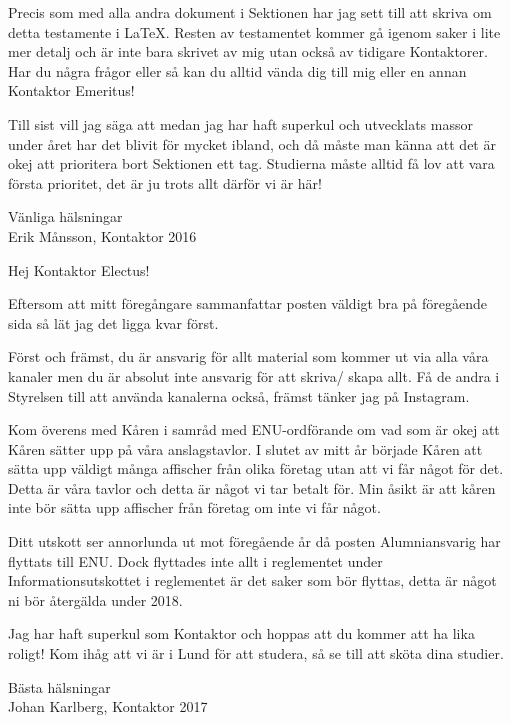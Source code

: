\documentclass[10pt]{article}
\begin{document}
Precis som med alla andra dokument i Sektionen har jag sett till att skriva om detta testamente i \LaTeX. Resten av testamentet kommer gå igenom saker i lite mer detalj och är inte bara skrivet av mig utan också av tidigare Kontaktorer. Har du några frågor eller så kan du alltid vända dig till mig eller en annan Kontaktor Emeritus!

Till sist vill jag säga att medan jag har haft superkul och utvecklats massor under året har det blivit för mycket ibland, och då måste man känna att det är okej att prioritera bort Sektionen ett tag. Studierna måste alltid få lov att vara första prioritet, det är ju trots allt därför vi är här!

\begin{itshape}
Vänliga hälsningar\\
Erik Månsson, Kontaktor 2016\\
\end{itshape}
\newpage
Hej Kontaktor Electus!

Eftersom att mitt föregångare sammanfattar posten väldigt bra på föregående sida så lät jag det ligga kvar först.

Först och främst, du är ansvarig för allt material som kommer ut via alla våra kanaler men du är absolut inte ansvarig för att skriva/ skapa allt. Få de andra i Styrelsen till att använda kanalerna också, främst tänker jag på Instagram.

Kom överens med Kåren i samråd med ENU-ordförande om vad som är okej att Kåren sätter upp på våra anslagstavlor. I slutet av mitt år började Kåren att sätta upp väldigt många affischer från olika företag utan att vi får något för det. Detta är våra tavlor och detta är något vi tar betalt för. Min åsikt är att kåren inte bör sätta upp affischer från företag om inte vi får något.

Ditt utskott ser annorlunda ut mot föregående år då posten Alumniansvarig har flyttats till ENU. Dock flyttades inte allt i reglementet under Informationsutskottet i reglementet är det saker som bör flyttas, detta är något ni bör återgälda under 2018.

Jag har haft superkul som Kontaktor och hoppas att du kommer att ha lika roligt! Kom ihåg att vi är i Lund för att studera, så se till att sköta dina studier.

\begin{itshape}
Bästa hälsningar\\
Johan Karlberg, Kontaktor 2017\\
\end{itshape}
\newpage
\end{document}
